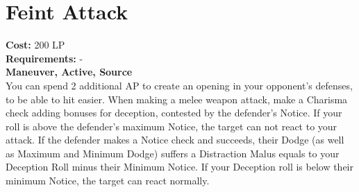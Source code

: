\section{Feint Attack}\label{maneuver:feintAttack}
\textbf{Cost:} 200 LP\\
\textbf{Requirements:} -\\
\textbf{Maneuver, Active, Source}\\
You can spend 2 additional AP to create an opening in your opponent's defenses, to be able to hit easier.
When making a melee weapon attack, make a Charisma check adding bonuses for deception, contested by the defender's Notice.
If your roll is above the defender's maximum Notice, the target can not react to your attack.
If the defender makes a Notice check and succeeds, their Dodge (as well as Maximum and Minimum Dodge) suffers a Distraction Malus equals to your Deception Roll minus their Minimum Notice.
If your Deception roll is below their minimum Notice, the target can react normally.\\
